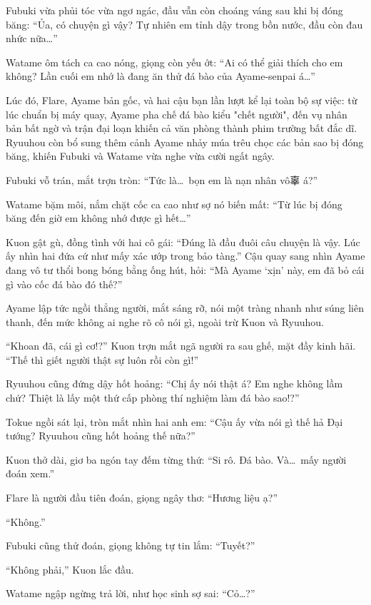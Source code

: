 \documentclass[../main.tex]{subfiles}
\begin{document}
Fubuki vừa phủi tóc vừa ngơ ngác, đầu vẫn còn choáng váng sau khi bị đóng băng: ``Ủa, có chuyện gì vậy? Tự nhiên em tỉnh dậy trong bồn nước, đầu còn đau nhức nữa\dots''

Watame ôm tách ca cao nóng, giọng còn yếu ớt: ``Ai có thể giải thích cho em không? Lần cuối em nhớ là đang ăn thử đá bào của Ayame-senpai á\dots''

Lúc đó, Flare, Ayame bản gốc, và hai cậu bạn lần lượt kể lại toàn bộ sự việc: từ lúc chuẩn bị máy quay, Ayame pha chế đá bào kiểu "chết người", đến vụ nhân bản bất ngờ và trận đại loạn khiến cả văn phòng thành phim trường bất đắc dĩ. Ryuuhou còn bổ sung thêm cảnh Ayame nhảy múa trêu chọc các bản sao bị đóng băng, khiến Fubuki và Watame vừa nghe vừa cười ngất ngây.

Fubuki vỗ trán, mắt trợn tròn: ``Tức là\dots\ bọn em là nạn nhân vô辜 á?''

Watame bặm môi, nắm chặt cốc ca cao như sợ nó biến mất: ``Từ lúc bị đóng băng đến giờ em không nhớ được gì hết\dots''

Kuon gật gù, đồng tình với hai cô gái: ``Đúng là đầu đuôi câu chuyện là vậy. Lúc ấy nhìn hai đứa cứ như mấy xác ướp trong bảo tàng.'' Cậu quay sang nhìn Ayame đang vô tư thổi bong bóng bằng ống hút, hỏi: ``Mà Ayame `xịn' này, em đã bỏ cái gì vào cốc đá bào đó thế?''

Ayame lập tức ngồi thẳng người, mắt sáng rỡ, nói một tràng nhanh như súng liên thanh, đến mức không ai nghe rõ cô nói gì, ngoài trừ Kuon và Ryuuhou.

``Khoan đã, cái gì cơ!?'' Kuon trợn mắt ngã người ra sau ghế, mặt đầy kinh hãi. ``Thế thì giết người thật sự luôn rồi còn gì!''

Ryuuhou cũng đứng dậy hốt hoảng: ``Chị ấy nói thật á? Em nghe không lầm chứ? Thiệt là lấy một thứ cấp phòng thí nghiệm làm đá bào sao!?''

Tokue ngồi sát lại, tròn mắt nhìn hai anh em: ``Cậu ấy vừa nói gì thế hả Đại tướng? Ryuuhou cũng hốt hoảng thế nữa?''

Kuon thở dài, giơ ba ngón tay đếm từng thứ: ``Si rô. Đá bào. Và\dots\ mấy người đoán xem.''

Flare là người đầu tiên đoán, giọng ngây thơ: ``Hương liệu ạ?''

``Không.''

Fubuki cũng thử đoán, giọng không tự tin lắm: ``Tuyết?''

``Không phải,'' Kuon lắc đầu.

Watame ngập ngừng trả lời, như học sinh sợ sai: ``Cỏ\dots?''
\end{document}

